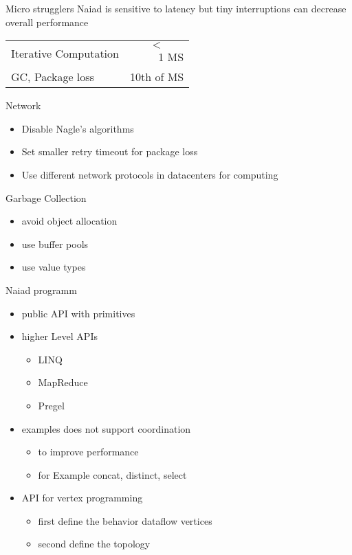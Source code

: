  \begin{frame}[t]{Micro strugglers}
  \vspace{0.15cm}
Naiad is sensitive to latency but tiny interruptions can decrease overall performance  

\begin{tabular}{ l r }
  Iterative Computation & $$<$$ 1 MS \\
  GC, Package loss   & 10th of MS \\
\end{tabular}

Network

\begin{itemize}
\item Disable Nagle's algorithms
\item Set smaller retry timeout for package loss
\item Use different network protocols in datacenters for computing
\end{itemize}

Garbage Collection

\begin{itemize}
\item avoid object allocation
\item use buffer pools
\item use value types
\end{itemize}

\end{frame}

 \begin{frame}[t]{Naiad programm}
  \vspace{0.15cm}
   \begin{itemize}
     \item public API with primitives
     \item higher Level APIs
     \begin{itemize}
     \item LINQ
     \item MapReduce
     \item Pregel
     \end{itemize}
     \item examples does not support coordination
     \begin{itemize}
     \item to improve performance
     \item for Example concat, distinct, select
     \end{itemize}
     \item API for vertex programming
     \begin{itemize}
     \item first define the behavior dataflow vertices
     \item second define the topology
     \end{itemize}
   \end{itemize}

\end{frame}
